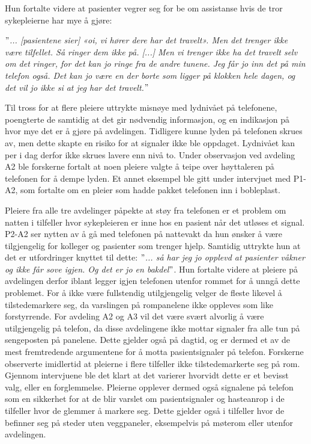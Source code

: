 \noindent
Hun fortalte videre at pasienter vegrer seg for be om assistanse hvis de tror sykepleierne har mye å gjøre:

\noindent
\textit{$"$... [pasientene sier] «oi, vi hører dere har det travelt». Men det trenger ikke være tilfellet. Så ringer dem ikke på. [...] Men vi trenger ikke ha det travelt selv om det ringer, for det kan jo ringe fra de andre tunene. Jeg får jo inn det på min telefon også. Det kan jo være en der borte som ligger på klokken hele dagen, og det vil jo ikke si at jeg har det travelt.$"$}

\noindent
Til tross for at flere pleiere uttrykte misnøye med lydnivået på telefonene, poengterte de samtidig at det gir nødvendig informasjon, og en indikasjon på hvor mye det er å gjøre på avdelingen. Tidligere kunne lyden på telefonen skrues av, men dette skapte en risiko for at signaler ikke ble oppdaget. Lydnivået kan per i dag derfor ikke skrues lavere enn nivå to. Under observasjon ved avdeling A2 ble forskerne fortalt at noen pleiere valgte å teipe over høyttaleren på telefonen for å dempe lyden. Et annet eksempel ble gitt under intervjuet med P1-A2, som fortalte om en pleier som hadde pakket telefonen inn i bobleplast.

\noindent
Pleiere fra alle tre avdelinger påpekte at støy fra telefonen er et problem om natten i tilfeller hvor sykepleieren er inne hos en pasient når det utløses et signal. P2-A2 ser nytten av å gå med telefonen på nattevakt da hun ønsker å være tilgjengelig for kolleger og pasienter som trenger hjelp. Samtidig uttrykte hun at det er utfordringer knyttet til dette: \textit{ $"$... så har jeg jo opplevd at pasienter våkner og ikke får sove igjen. Og det er jo en bakdel$"$}. Hun fortalte videre at pleiere på avdelingen derfor iblant legger igjen telefonen utenfor rommet for å unngå dette problemet. For å ikke være fullstendig utilgjengelig velger de fleste likevel å tilstedemarkere seg, da varslingen på rompanelene ikke oppleves som like forstyrrende. For avdeling A2 og A3 vil det være svært alvorlig å være utilgjengelig på telefon, da disse avdelingene ikke mottar signaler fra alle tun på sengeposten på panelene. Dette gjelder også på dagtid, og er dermed et av de mest fremtredende argumentene for å motta pasientsignaler på telefon. Forskerne observerte imidlertid at pleierne i flere tilfeller ikke tilstedemarkerte seg på rom. Gjennom intervjuene ble det klart at det varierer hvorvidt dette er et bevisst valg, eller en forglemmelse. Pleierne opplever dermed også signalene på telefon som en sikkerhet for at de blir varslet om pasientsignaler og hasteanrop i de tilfeller hvor de glemmer å markere seg. Dette gjelder også i tilfeller hvor de befinner seg på steder uten veggpaneler, eksempelvis på møterom eller utenfor avdelingen.


